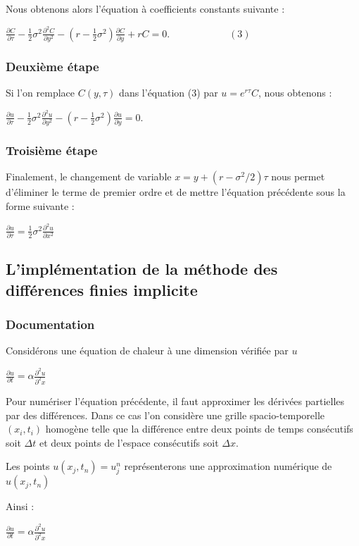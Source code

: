 \documentclass[a4paper, 12pt]{article}
\begin{document}
Nous obtenons alors l'équation à coefficients constants suivante :

$\frac{\partial C}{\partial \tau}-\frac{1}{2}\sigma^2\frac{\partial^2 C}{\partial y^2}-\left(r-\frac{1}{2}\sigma^2\right)\frac{\partial C}{\partial y}+rC=0.\qquad\qquad\qquad(3)$

\subsubsection{Deuxième étape}
Si l'on remplace $C(y,\tau)$ dans l'équation (3) par  $u=e^{r\tau}C$, nous obtenons :

$\frac{\partial u}{\partial \tau}-\frac{1}{2}\sigma^2\frac{\partial^2 u}{\partial y^2}-\left(r-\frac{1}{2}\sigma^2\right)\frac{\partial u}{\partial y}=0.$

\subsubsection{Troisième étape}
Finalement, le changement de variable $x=y+(r-\sigma^2/2)\tau$ nous permet d'éliminer le terme de premier ordre et de mettre l'équation précédente sous la forme suivante :

$\frac{\partial u}{\partial \tau}=\frac{1}{2}\sigma^2\frac{\partial^2 u}{\partial x^2}$

\subsection{L'implémentation de la méthode des différences finies implicite}
\subsubsection{Documentation}
Considérons une équation de chaleur à une dimension vérifiée par $u$

$\frac{\partial u}{\partial t}=\alpha \frac{\partial^2 u}{\partial^2 x}$

Pour numériser l'équation précédente, il faut approximer les dérivées partielles par des différences. Dans ce cas l'on considère une grille spacio-temporelle $(x_i,t_i)$ homogène telle que la différence entre deux points de temps consécutifs soit $\Delta{t}$ et deux points de l'espace consécutifs soit $\Delta{x}$.

Les points $u(x_j,t_n)=u^n_j$ représenterons une approximation numérique de $u(x_j,t_n)$

Ainsi :

$\frac{\partial u}{\partial t}=\alpha \frac{\partial^2 u}{\partial^2 x}$
\end{document}
